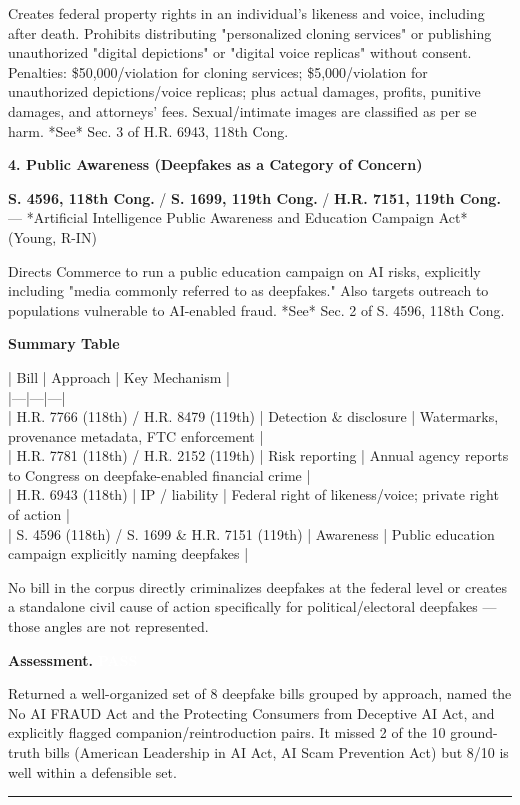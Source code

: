 \documentclass[11pt]{article}
\newcommand{\fieldlabel}[1]{\textbf{\color{navy}#1}\quad}
\begin{document}
Creates federal property rights in an individual's likeness and voice, including after death. Prohibits distributing "personalized cloning services" or publishing unauthorized "digital depictions" or "digital voice replicas" without consent. Penalties: \$50,000/violation for cloning services; \$5,000/violation for unauthorized depictions/voice replicas; plus actual damages, profits, punitive damages, and attorneys' fees. Sexual/intimate images are classified as per se harm. *See* Sec. 3 of H.R. 6943, 118th Cong.

\textbf{4. Public Awareness (Deepfakes as a Category of Concern)}

\textbf{S. 4596, 118th Cong.} / \textbf{S. 1699, 119th Cong.} / \textbf{H.R. 7151, 119th Cong.} --- *Artificial Intelligence Public Awareness and Education Campaign Act* (Young, R-IN)

Directs Commerce to run a public education campaign on AI risks, explicitly including "media commonly referred to as deepfakes." Also targets outreach to populations vulnerable to AI-enabled fraud. *See* Sec. 2 of S. 4596, 118th Cong.

\textbf{Summary Table}

| Bill | Approach | Key Mechanism | \\
|---|---|---| \\
| H.R. 7766 (118th) / H.R. 8479 (119th) | Detection \& disclosure | Watermarks, provenance metadata, FTC enforcement | \\
| H.R. 7781 (118th) / H.R. 2152 (119th) | Risk reporting | Annual agency reports to Congress on deepfake-enabled financial crime | \\
| H.R. 6943 (118th) | IP / liability | Federal right of likeness/voice; private right of action | \\
| S. 4596 (118th) / S. 1699 \& H.R. 7151 (119th) | Awareness | Public education campaign explicitly naming deepfakes |

No bill in the corpus directly criminalizes deepfakes at the federal level or creates a standalone civil cause of action specifically for political/electoral deepfakes --- those angles are not represented.

\fieldlabel{Assessment.} \colorbox{passgreen}{\textcolor{white}{\bfseries PASS}}\par
Returned a well-organized set of 8 deepfake bills grouped by approach, named the No AI FRAUD Act and the Protecting Consumers from Deceptive AI Act, and explicitly flagged companion/reintroduction pairs. It missed 2 of the 10 ground-truth bills (American Leadership in AI Act, AI Scam Prevention Act) but 8/10 is well within a defensible set.
\vspace{4pt}\hrule\vspace{8pt}
\end{document}
